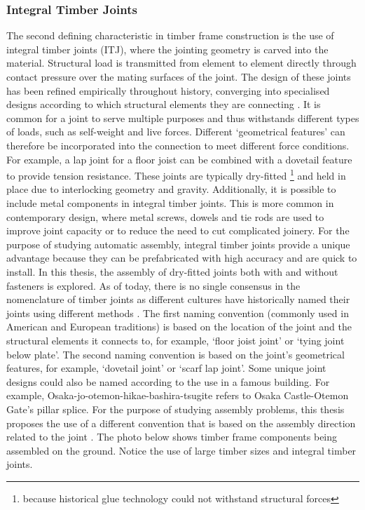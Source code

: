 \subsubsection{Integral Timber Joints}
\label{subsubsection:introduction_integral_timber_joints}

The second defining characteristic in timber frame construction is the use of integral timber joints (ITJ), where the jointing geometry is carved into the material. Structural load is transmitted from element to element directly through contact pressure over the mating surfaces of the joint. The design of these joints has been refined empirically throughout history, converging into specialised designs according to which structural elements they are connecting \autocite{jacksobonHistoricAmericanTimber2014}. It is common for a joint to serve multiple purposes and thus withstands different types of loads, such as self-weight and live forces. Different ‘geometrical features’ can therefore be incorporated into the connection to meet different force conditions. For example, a lap joint for a floor joist can be combined with a dovetail feature to provide tension resistance.
These joints are typically dry-fitted \footnote{because historical glue technology could not withstand structural forces} and held in place due to interlocking geometry and gravity.
Additionally, it is possible to include metal components in integral timber joints.
This is more common in contemporary design, where metal screws, dowels and tie rods are used to improve joint capacity or to reduce the need to cut complicated joinery.
For the purpose of studying automatic assembly, integral timber joints provide a unique advantage because they can be prefabricated with high accuracy  and are quick to install.
In this thesis, the assembly of dry-fitted joints both with and without fasteners is explored.
As of today, there is no single consensus in the nomenclature of timber joints as different cultures have historically named their joints using different methods \parencite{satoCompleteJapaneseJoinery1995,seikeArtJapaneseJoinery1977a,sumiyoshiWoodJointsClassical1991}. The first naming convention (commonly used in American and European traditions) is based on the location of the joint and the structural elements it connects to, for example, ‘floor joist joint’ or ‘tying joint below plate’. The second naming convention is based on the joint's geometrical features, for example, ‘dovetail joint’ or ‘scarf lap joint’. Some unique joint designs could also be named according to the use in a famous building. For example, Osaka-jo-otemon-hikae-bashira-tsugite refers to Osaka Castle-Otemon Gate's pillar splice. For the purpose of studying assembly problems, this thesis proposes the use of a different convention that is based on the assembly direction related to the joint .
The photo below shows timber frame components being assembled on the ground. Notice the use of large timber sizes and integral timber joints. 

